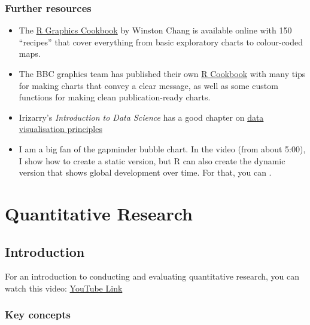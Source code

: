 \documentclass[
]{book}
\providecommand{\tightlist}{%
  \setlength{\itemsep}{0pt}\setlength{\parskip}{0pt}}
\begin{document}
\hypertarget{further-resources-visualisation}{%
\section{Further resources}\label{further-resources-visualisation}}

\begin{itemize}
\tightlist
\item
  The \href{https://r-graphics.org/}{R Graphics Cookbook} by Winston Chang is available online with 150 ``recipes'' that cover everything from basic exploratory charts to colour-coded maps.
\item
  The BBC graphics team has published their own \href{https://bbc.github.io/rcookbook/}{R Cookbook} with many tips for making charts that convey a clear message, as well as some custom functions for making clean publication-ready charts.
\item
  Irizarry's \emph{Introduction to Data Science} has a good chapter on \href{https://rafalab.github.io/dsbook/data-visualization-principles.html}{data visualisation principles}
\item
  I am a big fan of the gapminder bubble chart. In the video (from about 5:00), I show how to create a static version, but R can also create the dynamic version that shows global development over time. For that, you can .
\end{itemize}

\hypertarget{part-quantitative-research}{%
\part*{Quantitative Research}\label{part-quantitative-research}}

\hypertarget{introduction}{%
\chapter{Introduction}\label{introduction}}

For an introduction to conducting and evaluating quantitative research, you can watch this video:
\textcolor{blue}{\href{https://www.youtube.com/embed/sM7z8YoFLDo?rel=0&modestbranding=1&loop=1&playlist=sk7TT5qM5Hw}{YouTube Link}}

\hypertarget{key-concepts}{%
\section{Key concepts}\label{key-concepts}}
\end{document}
